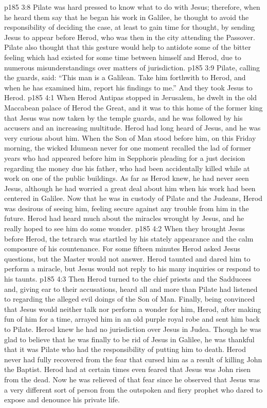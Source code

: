 \vs p185 3:8 Pilate was hard pressed to know what to do with Jesus; therefore, when he heard them say that he began his work in Galilee, he thought to avoid the responsibility of deciding the case, at least to gain time for thought, by sending Jesus to appear before Herod, who was then in the city attending the Passover. Pilate also thought that this gesture would help to antidote some of the bitter feeling which had existed for some time between himself and Herod, due to numerous misunderstandings over matters of jurisdiction.
\vs p185 3:9 Pilate, calling the guards, said: “This man is a Galilean. Take him forthwith to Herod, and when he has examined him, report his findings to me.” And they took Jesus to Herod.
\vs p185 4:1 When Herod Antipas stopped in Jerusalem, he dwelt in the old Maccabean palace of Herod the Great, and it was to this home of the former king that Jesus was now taken by the temple guards, and he was followed by his accusers and an increasing multitude. Herod had long heard of Jesus, and he was very curious about him. When the Son of Man stood before him, on this Friday morning, the wicked Idumean never for one moment recalled the lad of former years who had appeared before him in Sepphoris pleading for a just decision regarding the money due his father, who had been accidentally killed while at work on one of the public buildings. As far as Herod knew, he had never seen Jesus, although he had worried a great deal about him when his work had been centered in Galilee. Now that he was in custody of Pilate and the Judeans, Herod was desirous of seeing him, feeling secure against any trouble from him in the future. Herod had heard much about the miracles wrought by Jesus, and he really hoped to see him do some wonder.
\vs p185 4:2 When they brought Jesus before Herod, the tetrarch was startled by his stately appearance and the calm composure of his countenance. For some fifteen minutes Herod asked Jesus questions, but the Master would not answer. Herod taunted and dared him to perform a miracle, but Jesus would not reply to his many inquiries or respond to his taunts.
\vs p185 4:3 Then Herod turned to the chief priests and the Sadducees and, giving ear to their accusations, heard all and more than Pilate had listened to regarding the alleged evil doings of the Son of Man. Finally, being convinced that Jesus would neither talk nor perform a wonder for him, Herod, after making fun of him for a time, arrayed him in an old purple royal robe and sent him back to Pilate. Herod knew he had no jurisdiction over Jesus in Judea. Though he was glad to believe that he was finally to be rid of Jesus in Galilee, he was thankful that it was Pilate who had the responsibility of putting him to death. Herod never had fully recovered from the fear that cursed him as a result of killing John the Baptist. Herod had at certain times even feared that Jesus was John risen from the dead. Now he was relieved of that fear since he observed that Jesus was a very different sort of person from the outspoken and fiery prophet who dared to expose and denounce his private life.
